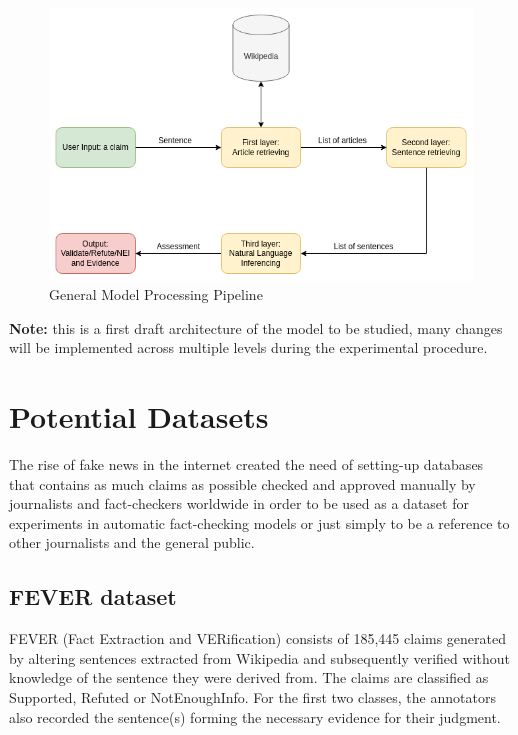\documentclass[10pt, english]{report}
\begin{document}
\begin{figure}[H]
	\centering
	\includegraphics[scale=0.6]{img/use_case.png}
	\caption{General Model Processing Pipeline}
\end{figure}

\textbf{Note:} this is a first draft architecture of the model to be studied, many changes will be implemented across multiple levels during the experimental procedure.

\chapter{Potential Datasets}
The rise of fake news in the internet created the need of setting-up databases that contains as much claims as possible checked and approved manually by journalists and fact-checkers worldwide in order to be used as a dataset for experiments in automatic fact-checking models or just simply to be a reference to other journalists and the general public.

\section{FEVER dataset \cite{thorne2018fever}}
\label{sec:fever}
FEVER (Fact Extraction and VERification) consists of 185,445 claims generated by altering sentences extracted from Wikipedia and subsequently verified without knowledge of the sentence they were derived from. The claims are classified as Supported, Refuted or NotEnoughInfo. For the first two classes, the annotators also recorded the sentence(s) forming the necessary evidence for their judgment\cite{thorne2018fever}.
\end{document}
